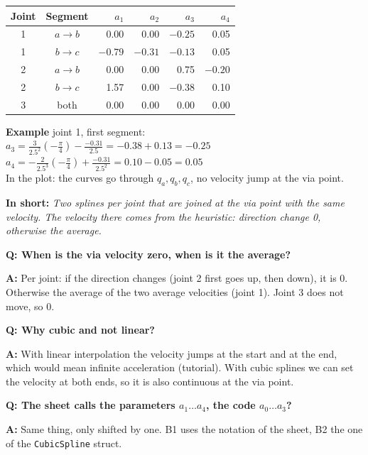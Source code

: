 \documentclass[10pt,a4paper]{article}
\newcommand{\frage}[2]{\textbf{Q: #1}\par\nopagebreak\vspace{1pt}\textbf{A:} #2\par\vspace{5pt}}
\newcommand{\sagen}[1]{\textbf{In short:} \emph{#1}\par}
\newcommand{\code}[1]{\texttt{#1}}
\begin{document}
\begin{minipage}[c]{0.5\textwidth}
{\small
\begin{tabular}{ccrrrr}
  \toprule
  Joint & Segment & $a_1$ & $a_2$ & $a_3$ & $a_4$ \\
  \midrule
  1 & $a \to b$ & 0.00    & 0.00    & $-0.25$ & 0.05 \\
  1 & $b \to c$ & $-0.79$ & $-0.31$ & $-0.13$ & 0.05 \\
  2 & $a \to b$ & 0.00    & 0.00    & 0.75    & $-0.20$ \\
  2 & $b \to c$ & 1.57    & 0.00    & $-0.38$ & 0.10 \\
  3 & both      & 0.00    & 0.00    & 0.00    & 0.00 \\
  \bottomrule
\end{tabular}
}
\end{minipage}\hfill
\begin{minipage}[c]{0.47\textwidth}
\textbf{Example} joint 1, first segment:\\
$a_3 = \frac{3}{2.5^2}(-\frac{\pi}{4}) - \frac{-0.31}{2.5} = -0.38 + 0.13 = -0.25$\\
$a_4 = -\frac{2}{2.5^3}(-\frac{\pi}{4}) + \frac{-0.31}{2.5^2} = 0.10 - 0.05 = 0.05$\\
In the plot: the curves go through $q_a, q_b, q_c$, no velocity jump at the via point.
\end{minipage}

\sagen{Two splines per joint that are joined at the via point with the same velocity. The velocity there comes from the
heuristic: direction change 0, otherwise the average.}

\begin{fragen}
\frage{When is the via velocity zero, when is it the average?}
{Per joint: if the direction changes (joint 2 first goes up, then down), it is 0. Otherwise the average of the two
average velocities (joint 1). Joint 3 does not move, so 0.}
\frage{Why cubic and not linear?}
{With linear interpolation the velocity jumps at the start and at the end, which would mean infinite acceleration
(tutorial). With cubic splines we can set the velocity at both ends, so it is also continuous at the via point.}
\frage{The sheet calls the parameters $a_1 \ldots a_4$, the code $a_0 \ldots a_3$?}
{Same thing, only shifted by one. B1 uses the notation of the sheet, B2 the one of the \code{CubicSpline} struct.}
\end{fragen}

\end{document}

